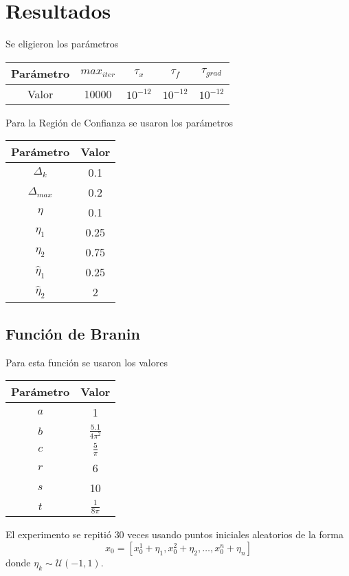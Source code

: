 \documentclass[11pt,letterpaper]{article}
\theoremstyle{definition}
\theoremstyle{definition}
\theoremstyle{definition}
\begin{document}
\section{Resultados}
Se eligieron los parámetros
\begin{center}
	\begin{tabular}{ccccc}
		\hline
		Parámetro & $ max_{iter} $ & $ \tau_x $ & $ \tau_f $ & $ \tau_{grad} $ \\
		\hline
		 Valor    &      10000     & $ 10^{-12} $ & $ 10^{-12} $ & $ 10^{-12} $  \\
		\hline
	\end{tabular}
\end{center}
Para la Región de Confianza se usaron los parámetros
\begin{center}
	\begin{tabular}{cc}
		\hline
		Parámetro & Valor \\
		\hline
		$ \Delta_k $   & 0.1 \\
		$ \Delta_{max} $ & 0.2 \\
		$ \eta $       & 0.1 \\
		$ \eta_1 $     & 0.25 \\
		$ \eta_2 $     & 0.75 \\
		$ \hat{\eta}_1 $ & 0.25 \\
		$ \hat{\eta}_2 $ & 2 \\
		\hline
	\end{tabular}
\end{center}
\subsection{Función de Branin}
Para esta función se usaron los valores
\begin{center}
	\begin{tabular}{cc}
		\hline
		Parámetro & Valor \\
		\hline
		$ a $ & 1 \\
		$ b $ & $ \frac{5.1}{4 \pi^2} $ \\
		$ c $ & $ \frac{5}{\pi} $ \\
		$ r $ & 6 \\
		$ s $ & 10 \\
		$ t $ & $ \frac{1}{8 \pi} $ \\
		\hline
	\end{tabular}
\end{center}
El experimento se repitió $ 30 $ veces usando puntos iniciales aleatorios de la forma
\[ x_0 = [x_0^1 + \eta_1, x_0^2 + \eta_2, \dots, x_0^n + \eta_n] \]
donde $ \eta_k \sim \mathcal{U}(-1,1) $. 
\end{document}
